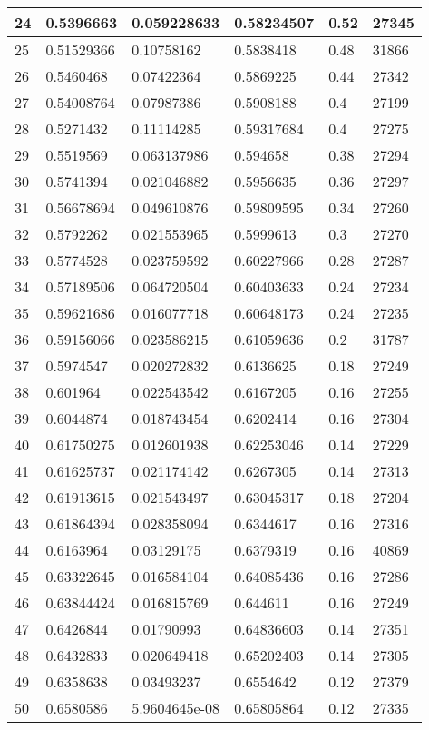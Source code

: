 \begin{longtable}{|l|l|l|l|l|l|}
24 & 0.5396663 & 0.059228633 & 0.58234507 & 0.52 & 27345 \\ \hline 
25 & 0.51529366 & 0.10758162 & 0.5838418 & 0.48 & 31866 \\ \hline 
26 & 0.5460468 & 0.07422364 & 0.5869225 & 0.44 & 27342 \\ \hline 
27 & 0.54008764 & 0.07987386 & 0.5908188 & 0.4 & 27199 \\ \hline 
28 & 0.5271432 & 0.11114285 & 0.59317684 & 0.4 & 27275 \\ \hline 
29 & 0.5519569 & 0.063137986 & 0.594658 & 0.38 & 27294 \\ \hline 
30 & 0.5741394 & 0.021046882 & 0.5956635 & 0.36 & 27297 \\ \hline 
31 & 0.56678694 & 0.049610876 & 0.59809595 & 0.34 & 27260 \\ \hline 
32 & 0.5792262 & 0.021553965 & 0.5999613 & 0.3 & 27270 \\ \hline 
33 & 0.5774528 & 0.023759592 & 0.60227966 & 0.28 & 27287 \\ \hline 
34 & 0.57189506 & 0.064720504 & 0.60403633 & 0.24 & 27234 \\ \hline 
35 & 0.59621686 & 0.016077718 & 0.60648173 & 0.24 & 27235 \\ \hline 
36 & 0.59156066 & 0.023586215 & 0.61059636 & 0.2 & 31787 \\ \hline 
37 & 0.5974547 & 0.020272832 & 0.6136625 & 0.18 & 27249 \\ \hline 
38 & 0.601964 & 0.022543542 & 0.6167205 & 0.16 & 27255 \\ \hline 
39 & 0.6044874 & 0.018743454 & 0.6202414 & 0.16 & 27304 \\ \hline 
40 & 0.61750275 & 0.012601938 & 0.62253046 & 0.14 & 27229 \\ \hline 
41 & 0.61625737 & 0.021174142 & 0.6267305 & 0.14 & 27313 \\ \hline 
42 & 0.61913615 & 0.021543497 & 0.63045317 & 0.18 & 27204 \\ \hline 
43 & 0.61864394 & 0.028358094 & 0.6344617 & 0.16 & 27316 \\ \hline 
44 & 0.6163964 & 0.03129175 & 0.6379319 & 0.16 & 40869 \\ \hline 
45 & 0.63322645 & 0.016584104 & 0.64085436 & 0.16 & 27286 \\ \hline 
46 & 0.63844424 & 0.016815769 & 0.644611 & 0.16 & 27249 \\ \hline 
47 & 0.6426844 & 0.01790993 & 0.64836603 & 0.14 & 27351 \\ \hline 
48 & 0.6432833 & 0.020649418 & 0.65202403 & 0.14 & 27305 \\ \hline 
49 & 0.6358638 & 0.03493237 & 0.6554642 & 0.12 & 27379 \\ \hline 
50 & 0.6580586 & 5.9604645e-08 & 0.65805864 & 0.12 & 27335 \\ \hline 
\end{longtable}